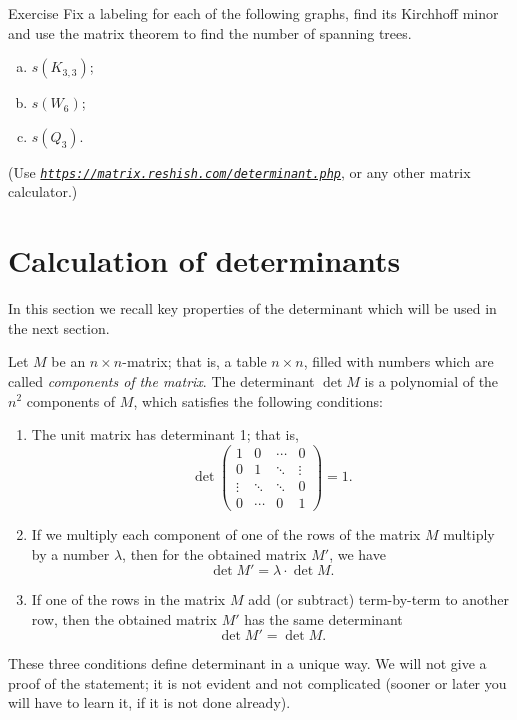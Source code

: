 \begin{thm}{Exercise}
Fix a labeling for each of the following graphs, 
find its Kirchhoff minor and use the matrix theorem to find the number of spanning trees.
\begin{enumerate}[(a)]
\item $s(K_{3,3})$;
\item $s(W_6)$;
\item $s(Q_3)$.
\end{enumerate}
(Use \href{https://matrix.reshish.com/determinant.php}{\emph{\texttt{https://matrix.reshish.com/determinant.php}}}, or any other matrix calculator.)
\end{thm}


\section*{Calculation of determinants}

In this section we recall key properties of the determinant which will be used in the next section.

Let $M$ be an $n{\times}n$-matrix; that is, a table $n{\times}n$, filled with numbers which are called {}\emph{components of the matrix}.
The determinant $\det M$ is a polynomial of the $n^2$ components of $M$,
which satisfies the following conditions:
\begin{enumerate}
 \item\label{1} The unit matrix has determinant 1; that is,
\[
\det\left(
\begin{matrix}
1&0&\cdots&0
\\
0&1&\ddots&\vdots
\\
\vdots&\ddots&\ddots&0
\\
0&\cdots&0&1
\end{matrix}
\right)=1.
\]
\item\label{2} If we multiply each component of one of the rows of the matrix $M$ multiply by a number $\lambda$, then for the obtained matrix $M'$, we have
\[\det M'=\lambda\cdot \det M.\]

\item\label{3} If one of the rows in the matrix $M$ add (or subtract) term-by-term to another row, then the obtained matrix $M'$ has the same determinant
\[\det M'= \det M.\]
\end{enumerate}
These three conditions define determinant in a unique way. 
We will not give a proof of the statement; it is not evident and not complicated (sooner or later you will have to learn it, if it is not done already).


